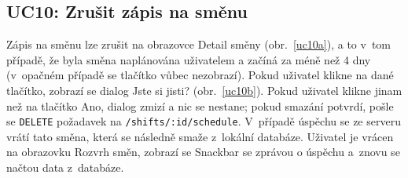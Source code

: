 \documentclass[twoside]{ctuthesis}
\begin{document}
\subsection{UC10: Zrušit zápis na směnu}

Zápis na směnu lze zrušit na obrazovce Detail směny (obr.~\ref{uc10a}), a to v~tom případě, že byla směna naplánována uživatelem a začíná za méně než 4 dny (v~opačném případě se tlačítko  vůbec nezobrazí). Pokud uživatel klikne na dané tlačítko, zobrazí se dialog Jste si jisti? (obr.~\ref{uc10b}). Pokud uživatel klikne jinam než na tlačítko Ano, dialog zmizí a nic se nestane; pokud smazání potvrdí, pošle se \texttt{DELETE} požadavek na \texttt{/shifts/:id/schedule}. V~případě úspěchu se ze serveru vrátí tato směna, která se následně smaže z~lokální databáze. Uživatel je vrácen na obrazovku Rozvrh směn, zobrazí se Snackbar se zprávou o úspěchu a~znovu se načtou data z~databáze.
\end{document}
